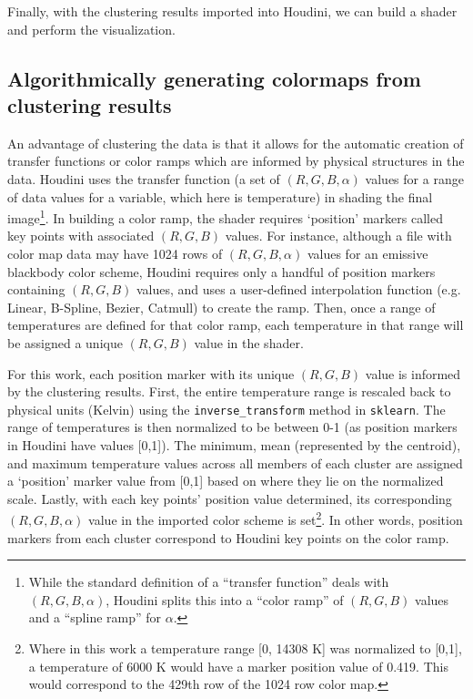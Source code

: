 \documentclass[fleqn,usenatbib,useAMS]{mnras}
\begin{document}
Finally, with the clustering results imported into Houdini, we can build a shader and perform the visualization. \par

\subsection{Algorithmically generating colormaps from clustering results}\label{subsec:colormap}

An advantage of clustering the data is that it allows for the automatic creation of transfer functions or color ramps which are informed by physical structures in the data. Houdini uses the transfer function (a set of $(R,G,B, \alpha)$ values for a range of data values for a variable, which here is temperature) in shading the final image\footnote{While the standard definition of a ``transfer function'' deals with $(R,G,B, \alpha)$, Houdini splits this into a ``color ramp'' of $(R,G,B)$ values and a ``spline ramp'' for $\alpha$.}. In building a color ramp, the shader requires `position' markers called key points with associated $(R,G,B)$ values. For instance, although a file with color map data may have 1024 rows of $(R,G,B, \alpha)$ values for an emissive blackbody color scheme, Houdini requires only a handful of position markers containing $(R,G,B)$ values, and uses a user-defined interpolation function (e.g. Linear, B-Spline, Bezier, Catmull) to create the ramp. Then, once a range of temperatures are defined for that color ramp, each temperature in that range will be assigned a unique $(R,G,B)$ value in the shader. \par

For this work, each position marker with its unique $(R,G,B)$ value is informed by the clustering results. First, the entire temperature range is rescaled back to physical units (Kelvin) using the \texttt{inverse\_transform} method in \texttt{sklearn}. The range of temperatures is then normalized to be between 0-1 (as position markers in Houdini have values [0,1]). The minimum, mean (represented by the centroid), and maximum temperature values across all members of each cluster are assigned a `position' marker value from [0,1] based on where they lie on the normalized scale. Lastly, with each key points' position value determined, its corresponding $(R,G,B,\alpha)$ value in the imported color scheme is set\footnote{Where in this work a temperature range [0, 14308 K] was normalized to [0,1], a temperature of 6000 K would have a marker position value of 0.419. This would correspond to the 429th row of the 1024 row color map.}. In other words, position markers from each cluster correspond to Houdini key points on the color ramp. \par
\end{document}
